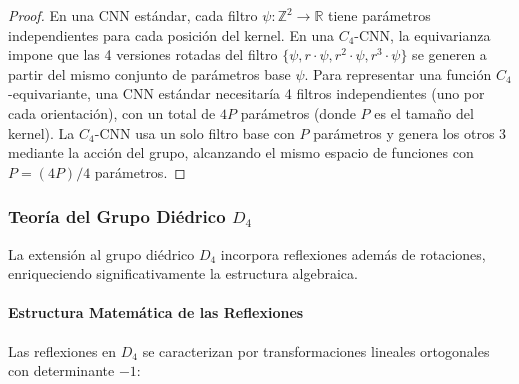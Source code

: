 \begin{proof}
En una CNN estándar, cada filtro $\psi: \mathbb{Z}^2 \to \mathbb{R}$ tiene parámetros independientes para cada posición del kernel. En una $C_4$-CNN, la equivarianza impone que las 4 versiones rotadas del filtro $\{\psi, r \cdot \psi, r^2 \cdot \psi, r^3 \cdot \psi\}$ se generen a partir del mismo conjunto de parámetros base $\psi$. Para representar una función $C_4$-equivariante, una CNN estándar necesitaría 4 filtros independientes (uno por cada orientación), con un total de $4P$ parámetros (donde $P$ es el tamaño del kernel). La $C_4$-CNN usa un solo filtro base con $P$ parámetros y genera los otros 3 mediante la acción del grupo, alcanzando el mismo espacio de funciones con $P = (4P)/4$ parámetros.
\end{proof}

\subsubsection{Teoría del Grupo Diédrico $D_4$}

La extensión al grupo diédrico $D_4$ incorpora reflexiones además de rotaciones, enriqueciendo significativamente la estructura algebraica.

\paragraph{Estructura Matemática de las Reflexiones}

Las reflexiones en $D_4$ se caracterizan por transformaciones lineales ortogonales con determinante $-1$:

